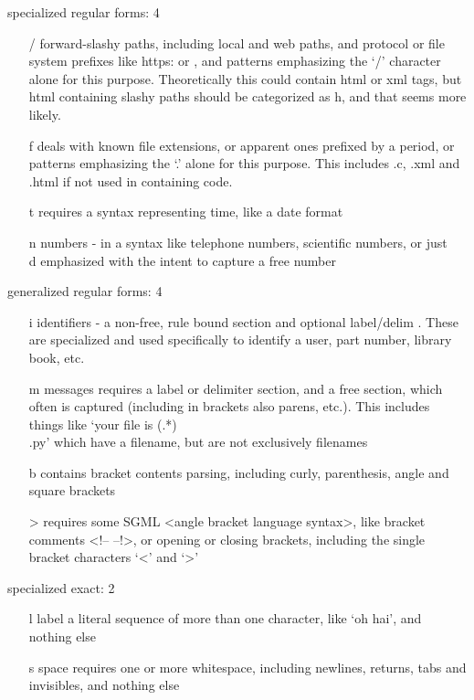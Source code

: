 specialized regular forms: 4
\begin{itemize}
\item[ / ] forward-slashy paths, including local and web paths, and protocol or file system prefixes like https: or , and patterns emphasizing the `/' character alone for this purpose.  Theoretically this could contain html or xml tags, but html containing slashy paths should be categorized as h, and that seems more likely.
\item[ f ] deals with known file extensions, or apparent ones prefixed by a period, or patterns emphasizing the `.'  alone for this purpose.  This includes .c, .xml and .html if not used in containing code.
\item[ t ] requires a syntax representing time, like a date format
\item[ n ] numbers - in a syntax like telephone numbers, scientific numbers, or just \\d emphasized with the intent to capture a free number
\end{itemize}

generalized regular forms: 4
\begin{itemize}
\item[ i ] identifiers - a non-free, rule bound section and optional label/delim .  These are specialized and used specifically to identify a user, part number, library book, etc.
\item[ m ] messages requires a label or delimiter section, and a free section, which often is captured (including in brackets also parens, etc.).  This includes things like `your file is (.*)\\.py' which have a filename, but are not exclusively filenames
\item[ b ] contains bracket contents parsing, including curly, parenthesis, angle and square brackets
\item[ > ] requires some SGML <angle bracket language syntax>, like bracket comments <!-- --!>, or opening or closing brackets, including the single bracket characters `<' and `>'
\end{itemize}


specialized exact: 2
\begin{itemize}
\item[ l ] label  a literal sequence of more than one character, like `oh hai', and nothing else
\item[ s ] space  requires one or more whitespace, including newlines, returns, tabs and invisibles, and nothing else
\end{itemize}


